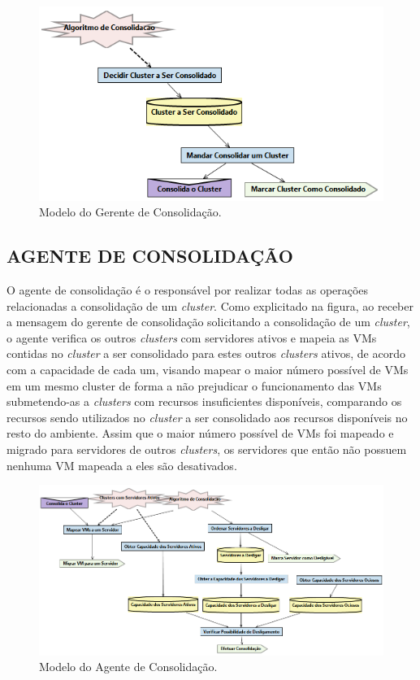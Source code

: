 \begin{figure}[!htb]
	\centering
	\caption{Modelo do Gerente de Consolidação.}\label{fig:gerente-consolidacao}
	\includegraphics[width=1\textwidth]{figuras/gerente-consolidacao.png}
\end{figure}

\subsection{AGENTE DE CONSOLIDAÇÃO}

O agente de consolidação é o responsável por realizar todas as operações relacionadas a consolidação de um \emph{cluster}. Como explicitado na figura, ao receber a mensagem do gerente de consolidação solicitando a consolidação de um \emph{cluster}, o agente verifica os outros \emph{clusters} com servidores ativos e mapeia as VMs contidas no \emph{cluster} a ser consolidado para estes outros \emph{clusters} ativos, de acordo com a capacidade de cada um, visando mapear o maior número possível de VMs em um mesmo cluster de forma a não prejudicar o funcionamento das VMs submetendo-as a \emph{clusters} com recursos insuficientes disponíveis, comparando os recursos sendo utilizados no \emph{cluster} a ser consolidado aos recursos disponíveis no resto do ambiente. Assim que o maior número possível de VMs foi mapeado e migrado para servidores de outros \emph{clusters}, os servidores que então não possuem nenhuma VM mapeada a eles são desativados.

\begin{figure}[!htb]
	\centering
	\caption{Modelo do Agente de Consolidação.}\label{fig:agente-consolidacao}
	\includegraphics[width=1\textwidth]{figuras/agente-consolidacao.png}
\end{figure}


